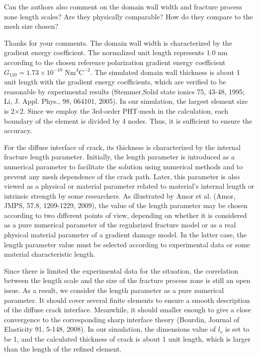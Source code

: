 \documentclass[12pt,fleqn]{article}
\begin{document}
\begin{question}{}\label{R1:Q10}
Can the authors also comment on the domain wall width and fracture process zone length scales? Are they physically comparable? How do they compare to the mesh size chosen?
\end{question}
\begin{response}
Thanks for your comments. The domain wall width is characterized by the gradient energy coefficient. The normalized unit length represents 1.0 nm according to the chosen reference polarization gradient energy coefficient $G_110=1.73×10^{-10}$ $\text{Nm}^4\text{C}^{-2}$. The simulated domain wall thickness is about 1 unit length with the  gradient energy coefficients, which are verified to be reasonable by experimental results (Stemmer,Solid state ionics 75, 43-48, 1995; Li, J. Appl. Phys., 98, 064101, 2005). In our simulation, the largest element size is 2×2. Since we employ the 3rd-order PHT-mesh in the calculation, each boundary of the element is divided by 4 nodes. Thus, it is sufficient to ensure the accuracy.

For the diffuse interface of crack, its thickness is characterized by the internal fracture length parameter. Initially, the length parameter is introduced as a numerical parameter to facilitate the solution using numerical methods and to prevent any mesh dependence of the crack path. Later, this parameter is also viewed as a physical or material parameter related to material’s internal length or intrinsic strength by some researchers. As illustrated by Amor et al. (Amor, JMPS, 57.8, 1209-1229, 2009), the value of the length parameter may be chosen according to two different points of view, depending on whether it is considered as a pure numerical parameter of the regularized fracture model or as a real physical material parameter of a gradient damage model. In the latter case, the length parameter value must be selected according to experimental data or some material characteristic length.

Since there is limited the experimental data for the situation, the correlation between the length scale and the size of the fracture process zone is still an open issue. As a result, we consider the length parameter as a pure numerical parameter. It should cover several finite elements to ensure a smooth description of the diffuse crack interface. Meanwhile, it should smaller enough to give a close convergence to the corresponding sharp interface theory (Bourdin, Journal of Elasticity 91, 5-148, 2008). In our simulation, the dimensions value of $l_v$ is set to be 1, and the calculated thickness of crack is about 1 unit length, which is larger than the length of the refined element. 
\end{response}
\end{document}
